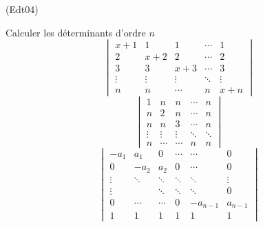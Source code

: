 \begin{tiny}(Edt04)\end{tiny}
Calculer les d{\'e}terminants d'ordre $n$
\begin{displaymath}
\begin{vmatrix}
x+1 & 1 & 1 & \cdots  & 1 \\
2 & x+2 & 2 & \cdots  & 2 \\
3 & 3 & x+3 & \cdots  & 3 \\
\vdots  & \vdots  & \vdots  & \ddots  & \vdots  \\
n & n & \cdots  & n & x+n
\end{vmatrix}
\end{displaymath}
\begin{displaymath}
\begin{vmatrix}
1 & n & n & \cdots  & n \\
n & 2 & n & \cdots  & n \\
n & n & 3 & \cdots  & n \\
\vdots  & \vdots  & \vdots  & \ddots  & \ddots  \\
n & \cdots  & \cdots  & n & n
\end{vmatrix}
\end{displaymath}
\begin{displaymath}
\begin{vmatrix}
-a_{1} & a_{1} & 0 & \cdots  & \cdots  & 0 \\
0 & -a_{2} & a_{2} & 0 & \cdots  & 0 \\
\vdots  & \ddots  & \ddots  & \ddots  & \ddots  & \vdots  \\
\vdots  &  & \ddots  & \ddots  & \ddots  & 0 \\
0 & \cdots  & \cdots  & 0 & -a_{n-1} & a_{n-1} \\
1 & 1 & 1 & 1 & 1 & 1
\end{vmatrix}
\end{displaymath}

